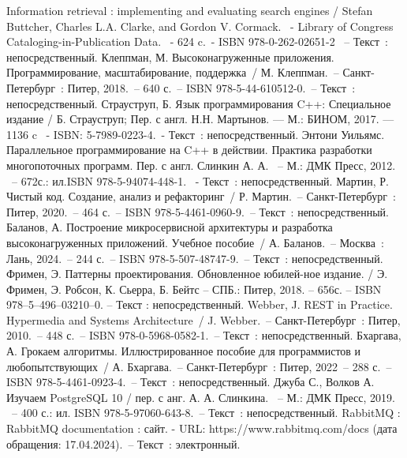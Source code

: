 \newsection
{}

\begin{thebibliography}{11}
	 Information retrieval : implementing and evaluating search engines / Stefan Buttcher, Charles L.A. Clarke, and Gordon V. Cormack. ~- Library of Congress Cataloging-in-Publication Data. ~- 624 c.~- ISBN 978-0-262-02651-2 ~– Текст~: непосредственный.
	 Клеппман, М. Высоконагруженные приложения. Программирование, масштабирование, поддержка~/ М. Клеппман.~– Санкт-Петербург~: Питер, 2018.~– 640 с.~– ISBN 978-5-44-610512-0.~– Текст~: непосредственный.
	 Страуструп, Б. Язык программирования C++: Специальное издание / Б. Страуструп; Пер. с англ. Н.Н. Мартынов. — М.: БИНОМ, 2017. — 1136 c ~- ISBN: 5-7989-0223-4.~- Текст~: непосредственный.
	 Энтони Уильямс. Параллельное программирование на C++ в действии. Практика разработки многопоточных программ. Пер. с англ. Слинкин А. А. ~– М.: ДМК Пресс, 2012. ~– 672с.: ил.ISBN 978-5-94074-448-1. ~- Текст~: непосредственный.
		Мартин, Р. Чистый код. Создание, анализ и рефакторинг~/ Р. Мартин.~– Санкт-Петербург~: Питер, 2020.~– 464 с.~– ISBN 978-5-4461-0960-9.~– Текст~: непосредственный.
     Баланов, А. Построение микросервисной архитектуры и разработка высоконагруженных приложений. Учебное пособие~/ А. Баланов.~– Москва~: Лань, 2024.~– 244 с.~– ISBN 978-5-507-48747-9.~– Текст~: непосредственный.
	 Фримен, Э. Паттерны проектирования. Обновленное юбилей-ное издание. / Э. Фримен, Э. Робсон, К. Сьерра, Б. Бейтс – СПБ.: Питер, 2018. – 656с. – ISBN 978–5–496–03210–0. – Текст : непосредственный.
		Webber, J. REST in Practice. Hypermedia and Systems Architecture~/ J. Webber.~– Санкт-Петербург~: Питер, 2010.~– 448 с.~– ISBN 978-0-5968-0582-1.~– Текст~: непосредственный.
	 Бхаргава, А. Грокаем алгоритмы. Иллюстрированное пособие для программистов и любопытствующих~/ А. Бхаргава.~– Санкт-Петербург~: Питер, 2022~– 288 с.~– ISBN 978-5-4461-0923-4.~– Текст~: непосредственный.
	 Джуба С., Волков А. Изучаем PostgreSQL 10 / пер. с анг. А. А. Слинкина. ~– М.: ДМК Пресс, 2019. ~– 400 с.: ил. ISBN 978-5-97060-643-8.~– Текст~: непосредственный.
	 RabbitMQ : RabbitMQ  documentation : сайт. - URL: https://www.rabbitmq.com/docs (дата обращения: 17.04.2024).~– Текст~: электронный.
\end{thebibliography}
